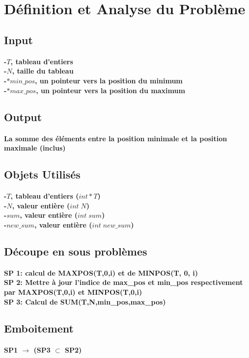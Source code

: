 %

\section{Définition et Analyse du Problème}\label{analyse}
\subsection{Input}
\paragraph{-$T$, tableau d'entiers \\ 
-$N$, taille du tableau\\
-$*min\_pos$, un pointeur vers la position du minimum\\
-$*max\_pos$, un pointeur vers la position du maximum}
\subsection{Output}
\paragraph{La somme des éléments entre la position minimale et la position maximale (inclus)}
\subsection{Objets Utilisés}
\paragraph{-$T$, tableau d'entiers ($int *T$) \\
-$N$, valeur entière ($int\;N$)\\
-$sum$, valeur entière ($int \;sum$)\\
-$new\_sum$, valeur entière ($int\; new\_sum$)\\
}
\subsection{Découpe en sous problèmes}
\paragraph{SP 1: calcul de MAXPOS(T,0,i) et de MINPOS(T, 0, i)\\
SP 2: Mettre à jour l'indice de max\_pos et min\_pos respectivement par MAXPOS(T,0,i) et MINPOS(T,0,i)\\
SP 3: Calcul de SUM(T,N,min\_pos,max\_pos)\\} 
\subsection{Emboitement}
\paragraph{SP1 $\rightarrow$ (SP3 $\subset$ SP2)}





